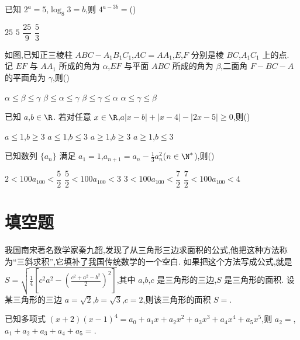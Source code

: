 \begin{problem}
已知 \(2^a=5\),\(\log_8 3=b\),则 \(4^{a-3b}=\)(\quad)

\choices
    {\(25\)}
    {\(5\)}
    {\(\dfrac{25}{9}\)}
    {\(\dfrac{5}{3}\)}
\end{problem}

\begin{problem}
如图,已知正三棱柱 \(ABC-A_1B_1C_1\),\(AC=AA_1\),\(E\),\(F\) 分别是棱 \(BC\),\(A_1C_1\) 上的点. 记 \(EF\) 与 \(AA_1\) 所成的角为 \(\alpha\),\(EF\) 与平面 \(ABC\) 所成的角为 \(\beta\),二面角 \(F-BC-A\) 的平面角为 \(\gamma\),则(\quad)


\choices
    {\(\alpha\le \beta\le \gamma\)}
    {\(\beta\le \alpha\le \gamma\)}
    {\(\beta\le \gamma\le \alpha\)}
    {\(\alpha\le \gamma\le \beta\)}
\end{problem}

\begin{problem}
已知 \(a\),\(b\in\R\). 若对任意 \(x\in\R\),\(a|x-b|+|x-4|-|2x-5|\ge 0\),则(\quad)

\choices
    {\(a\le 1\),\(b\ge 3\)}
    {\(a\le 1\),\(b\le 3\)}
    {\(a\ge 1\),\(b\ge 3\)}
    {\(a\ge 1\),\(b\le 3\)}
\end{problem}

\begin{problem}
已知数列 \(\{a_n\}\) 满足 \(a_1=1\),\(a_{n+1}=a_n-\frac13a_n^2\)(\(n\in\N^*\)),则(\quad)

\choices
    {\(2<100a_{100}<\dfrac52\)}
    {\(\dfrac52<100a_{100}<3\)}
    {\(3<100a_{100}<\dfrac72\)}
    {\(\dfrac72<100a_{100}<4\)}
\end{problem}

\section{填空题}

\begin{problem}
我国南宋著名数学家秦九韶,发现了从三角形三边求面积的公式,他把这种方法称为``三斜求积'',它填补了我国传统数学的一个空白. 如果把这个方法写成公式,就是 \(S=\sqrt{\frac14\left[c^2a^2-\left(\frac{c^2+a^2-b^2}{2}\right)^2\right]}\),其中 \(a\),\(b\),\(c\) 是三角形的三边,\(S\) 是三角形的面积. 设某三角形的三边 \(a=\sqrt2\),\(b=\sqrt3\),\(c=2\),则该三角形的面积 \(S=\)\fillinblank{}.
\end{problem}

\begin{problem}
已知多项式 \((x+2)(x-1)^4=a_0+a_1x+a_2x^2+a_3x^3+a_4x^4+a_5x^5\),则 \(a_2=\)\fillinblank{},\(a_1+a_2+a_3+a_4+a_5=\)\fillinblank{}.
\end{problem}

